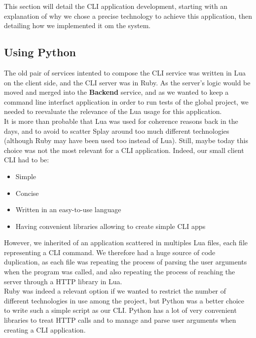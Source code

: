 \documentclass{eplmastersthesis}
\begin{document}
      This section will detail the CLI application development, starting
      with an explanation of why we chose a precise technology to achieve
      this application, then detailing how we implemented it om the system.

      \subsection{Using Python}

        The old pair of services intented to compose the CLI service was
        written in Lua on the client side, and the CLI server was in Ruby. As
        the server's logic would be moved and merged into the \textbf{Backend}
        service, and as we wanted to keep a command line interfact application
        in order to run tests of the global project, we needed to reevaluate
        the relevance of the Lua usage for this application.\\

        It is more than probable that Lua was used for coherence reasons back
        in the days, and to avoid to scatter Splay around too much different
        technologies (although Ruby may have been used too instead of Lua).
        Still, maybe today this choice was not the most relevant for a CLI
        application. Indeed, our small client CLI had to be:

        \begin{itemize}
          \item Simple
          \item Concise
          \item Written in an easy-to-use language
          \item Having convenient libraries allowing to create simple CLI apps
        \end{itemize}

        However, we inherited of an application scattered in multiples Lua
        files, each file representing a CLI command. We therefore had a huge
        source of code duplication, as each file was repeating the process
        of parsing the user arguments when the program was called, and also
        repeating the process of reaching the server through a HTTP library
        in Lua.\\
        Ruby was indeed a relevant option if we wanted to restrict the number
        of different technologies in use among the project, but Python was
        a better choice to write such a simple script as our CLI. Python has
        a lot of very convenient libraries to treat HTTP calls and to
        manage and parse user arguments when creating a CLI application.
\end{document}
